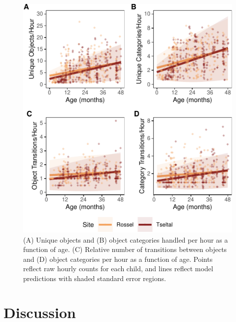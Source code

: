\documentclass[10pt, letterpaper]{article}
\newenvironment{CodeChunk}{}{}
\begin{document}
\begin{CodeChunk}
\begin{figure}[!ht]

{\centering \includegraphics{figs/age-effects-fig-1} 

}

\caption[(A) Unique objects and (B) object categories handled per hour as a function of age]{(A) Unique objects and (B) object categories handled per hour as a function of age. (C) Relative number of transitions between objects and (D) object categories per hour as a function of age. Points reflect raw hourly counts for each child, and lines reflect model predictions with shaded standard error regions.}\label{fig:age-effects-fig}
\end{figure}
\end{CodeChunk}

\hypertarget{discussion}{%
\section{Discussion}\label{discussion}}
\end{document}
